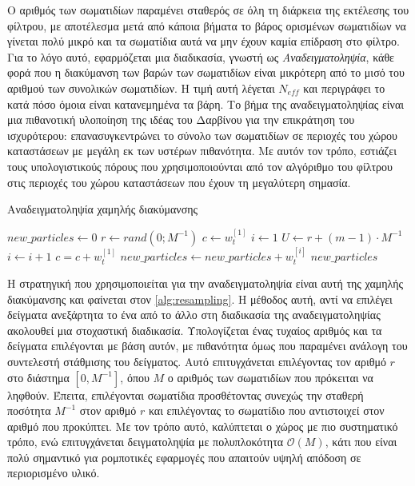 Ο αριθμός των σωματιδίων παραμένει σταθερός σε όλη τη διάρκεια της εκτέλεσης του φίλτρου, με αποτέλεσμα μετά από κάποια βήματα το βάρος ορισμένων σωματιδίων να γίνεται πολύ μικρό και τα σωματίδια αυτά να μην έχουν καμία επίδραση στο φίλτρο. Για το λόγο αυτό, εφαρμόζεται μια διαδικασία, γνωστή ως \emph{Αναδειγματοληψία}, κάθε φορά που η διακύμανση των βαρών των σωματιδίων είναι μικρότερη από το μισό του αριθμού των συνολικών σωματιδίων. Η τιμή αυτή λέγεται $N_{eff}$ και περιγράφει το κατά πόσο όμοια είναι κατανεμημένα τα βάρη. Το βήμα της αναδειγματοληψίας είναι μια πιθανοτική υλοποίηση της ιδέας του Δαρβίνου για την επικράτηση του ισχυρότερου: επανασυγκεντρώνει το σύνολο των σωματιδίων σε περιοχές του χώρου καταστάσεων με μεγάλη εκ των υστέρων πιθανότητα. Με αυτόν τον τρόπο, εστιάζει τους υπολογιστικούς πόρους που χρησιμοποιούνται από τον αλγόριθμο του φίλτρου στις περιοχές του χώρου καταστάσεων που έχουν τη μεγαλύτερη σημασία.

\begin{algorithm}[!ht]
 \caption{Αναδειγματοληψία χαμηλής διακύμανσης}
 \label{alg:resampling}
    \begin{algorithmic}[1]
        \State $new\_particles \gets 0$
        \State $r \gets rand(0;M^{-1})$
        \State $c \gets w_t^{[1]}$
        \State $i \gets 1$
            \State $U \gets r + (m-1) \cdot M^{-1}$
                \State $i \gets i + 1$
                \State $c = c + w_t^{[1]}$
            \EndWhile
            \State $new\_particles \gets new\_particles + w_t^{[i]}$
        \EndFor
        \State \Return $new\_particles$
    \end{algorithmic}
\end{algorithm}

Η στρατηγική που χρησιμοποιείται για την αναδειγματοληψία είναι αυτή της χαμηλής διακύμανσης και φαίνεται στον \autoref{alg:resampling}. Η μέθοδος αυτή, αντί να επιλέγει δείγματα ανεξάρτητα το ένα από το άλλο στη διαδικασία της αναδειγματοληψίας ακολουθεί μια στοχαστική διαδικασία. Υπολογίζεται ένας τυχαίος αριθμός και τα δείγματα επιλέγονται με βάση αυτόν, με πιθανότητα όμως που παραμένει ανάλογη του συντελεστή στάθμισης του δείγματος. Αυτό επιτυγχάνεται επιλέγοντας τον αριθμό $r$ στο διάστημα $[0, M^{-1}]$, όπου $M$ ο αριθμός των σωματιδίων που πρόκειται να ληφθούν. Έπειτα, επιλέγονται σωματίδια προσθέτοντας συνεχώς την σταθερή ποσότητα $M^{-1}$ στον αριθμό $r$ και επιλέγοντας το σωματίδιο που αντιστοιχεί στον αριθμό που προκύπτει. Με τον τρόπο αυτό, καλύπτεται ο χώρος με πιο συστηματικό τρόπο, ενώ επιτυγχάνεται δειγματοληψία με πολυπλοκότητα $\mathcal{O}(M)$, κάτι που είναι πολύ σημαντικό για ρομποτικές εφαρμογές που απαιτούν υψηλή απόδοση σε περιορισμένο υλικό.